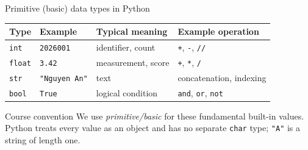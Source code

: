 \documentclass[aspectratio=169]{beamer}
\begin{document}
\begin{frame}{Primitive (basic) data types in Python}
  \begin{center}
    \setlength{\tabcolsep}{4pt}
    \begin{tabular}{L{0.16\textwidth}L{0.23\textwidth}L{0.27\textwidth}L{0.22\textwidth}}
      \toprule
      \textbf{Type} & \textbf{Example} & \textbf{Typical meaning} & \textbf{Example operation} \\
      \midrule
      \texttt{int} & \texttt{2026001} & identifier, count & \texttt{+}, \texttt{-}, \texttt{//} \\
      \addlinespace
      \texttt{float} & \texttt{3.42} & measurement, score & \texttt{+}, \texttt{*}, \texttt{/} \\
      \addlinespace
      \texttt{str} & \texttt{"Nguyen An"} & text & concatenation, indexing \\
      \addlinespace
      \texttt{bool} & \texttt{True} & logical condition & \texttt{and}, \texttt{or}, \texttt{not} \\
      \bottomrule
    \end{tabular}
  \end{center}

  \vspace{0.15em}
  \begin{alertblock}{Course convention}
    We use \emph{primitive/basic} for these fundamental built-in values. Python
    treats every value as an object and has no separate \texttt{char} type;
    \texttt{"A"} is a string of length one.
  \end{alertblock}
\end{frame}
\end{document}
